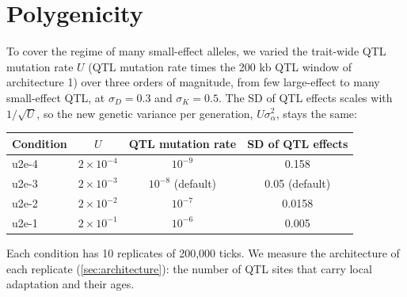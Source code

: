 

\section{Polygenicity}
\label{sec:polygenicity}

To cover the regime of many small-effect alleles, we varied the trait-wide
QTL mutation rate $U$ (QTL mutation rate times the 200 kb QTL window of
architecture 1) over three orders of magnitude, from few large-effect to
many small-effect QTL, at $\sigma_D=0.3$ and $\sigma_K=0.5$. The SD of QTL
effects scales with $1/\sqrt{U}$, so the new genetic variance per
generation, $U\sigma_\alpha^2$, stays the same:

\begin{center}
\begin{tabular}{lccc}
\toprule
Condition & $U$ & QTL mutation rate & SD of QTL effects \\
\midrule
u2e-4 & $2\times10^{-4}$ & $10^{-9}$ & 0.158 \\
u2e-3 & $2\times10^{-3}$ & $10^{-8}$ (default) & 0.05 (default) \\
u2e-2 & $2\times10^{-2}$ & $10^{-7}$ & 0.0158 \\
u2e-1 & $2\times10^{-1}$ & $10^{-6}$ & 0.005 \\
\bottomrule
\end{tabular}
\end{center}

\noindent Each condition has 10 replicates of 200,000 ticks. We measure the
architecture of each replicate (\cref{sec:architecture}): the number of QTL
sites that carry local adaptation and their ages.


